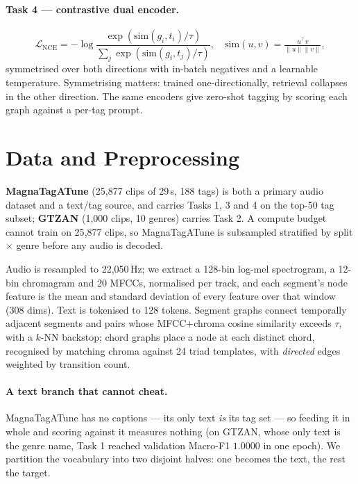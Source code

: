 \documentclass[10pt]{article}
\begin{document}
\paragraph{Task 4 --- contrastive dual encoder.}
\begin{equation}
\mathcal{L}_{\text{NCE}} = -\log
\frac{\exp(\mathrm{sim}(g_i,t_i)/\tau)}
     {\sum_{j}\exp(\mathrm{sim}(g_i,t_j)/\tau)},
\quad \mathrm{sim}(u,v) = \tfrac{u^\top v}{\lVert u\rVert\lVert v\rVert},
\label{eq:nce}
\end{equation}
symmetrised over both directions with in-batch negatives and a learnable
temperature. Symmetrising matters: trained one-directionally, retrieval
collapses in the other direction. The same encoders give zero-shot tagging by
scoring each graph against a per-tag prompt.

\vspace{-0.3em}
\section{Data and Preprocessing}



\textbf{MagnaTagATune} (25{,}877 clips of 29\,s, 188 tags) is both a primary
audio dataset and a text/tag source, and carries Tasks 1, 3 and 4 on the top-50
tag subset; \textbf{GTZAN} (1{,}000 clips, 10 genres) carries Task 2. A compute
budget cannot train on 25{,}877 clips, so MagnaTagATune is subsampled stratified
by split $\times$ genre before any audio is decoded.

Audio is resampled to 22{,}050\,Hz; we extract a 128-bin log-mel spectrogram, a
12-bin chromagram and 20 MFCCs, normalised per track, and each segment's node
feature is the mean and standard deviation of every feature over that window
(308 dims). Text is tokenised to 128 tokens. Segment graphs connect temporally
adjacent segments and pairs whose MFCC$+$chroma cosine similarity exceeds
$\tau$, with a $k$-NN backstop; chord graphs place a node at each distinct
chord, recognised by matching chroma against 24 triad templates, with
\emph{directed} edges weighted by transition count.

\paragraph{A text branch that cannot cheat.} MagnaTagATune has no captions ---
its only text \emph{is} its tag set --- so feeding it in whole and scoring
against it measures nothing (on GTZAN, whose only text is the genre name, Task 1
reached validation Macro-F1 $1.0000$ in one epoch). We partition the vocabulary
into two disjoint halves: one becomes the text, the rest the target.
\end{document}
